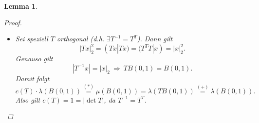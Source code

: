 \documentclass[a4paper]{report}
\theoremstyle{plain}
\newtheorem{lem}[thm]{Lemma}
\theoremstyle{definition}
\begin{document}
{{{{\begin{lem}
\begin{proof}
\begin{itemize}
            \item[2)] 
                Sei speziell $T$ orthogonal (d.h. $\exists T^{-1} = T^T$). Dann gilt
                \begin{displaymath}
                    |Tx|_2^2 = (Tx|Tx) = (T^TT|x) = |x|_2^2.
                \end{displaymath}
                Genauso gilt
                \begin{displaymath}
                    \tag{$+$}
                    |T^{-1}x| = |x|_2 \ \Rightarrow \ TB(0,1) = B(0,1).
                \end{displaymath}
                Damit folgt
                \[
                    c(T)\cdot \lambda(B(0,1)) \overset{(*)}{=} \mu(B(0,1)) = \lambda(TB(0,1)) \overset{(+)}{=} \lambda(B(0,1)).
                \]
                Also gilt $c(T) = 1 = |\det T|$, da $T^{-1} = T^T$.
            

\end{itemize}
\end{proof}
\end{lem}}}}}
\end{document}

